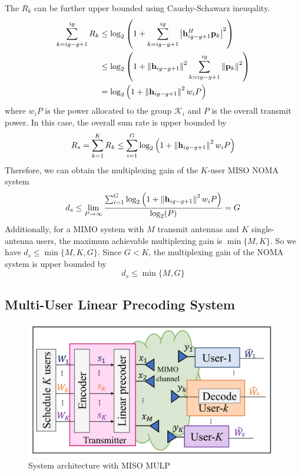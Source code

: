 \documentclass[10pt,conference]{IEEEtran}
\begin{document}
The $R_k$ can be further upper bounded using Cauchy-Schawarz ineuqality.
\begin{align}
    \sum_{k=ig-g+1}^{ig} R_k &\leq \log_2 \left( 1 + \sum_{k=ig-g+1}^{ig} \left| {\bf{h}}_{ig-g+1}^H {\bf{p}}_k \right|^2 \right) \nonumber \\
    & \leq \log_2 \left( 1 + \left\Vert{\bf{h}}_{ig-g+1}\right\Vert ^2 \sum_{k=ig-g+1}^{ig} \left\Vert {\bf{p}}_k \right\Vert^2 \right) \nonumber \\
    & = \log_2 \left( 1 + \left\Vert{\bf{h}}_{ig-g+1}\right\Vert ^2 w_i P \right)
\end{align}
where $w_i P$ is the power allocated to the group $\mathcal{K}_i$ and $P$ is the overall transmit power.
In this case, the overall sum rate is upper bounded by
\begin{equation}
    R_s = \sum_{k=1}^K R_k \leq \sum_{i=1}^G \log_2 \left( 1 + \left\Vert{\bf{h}}_{ig-g+1}\right\Vert ^2 w_i P \right) \label{46}
\end{equation}
Therefore, we can obtain the multiplexing gain of the $K$-user MISO NOMA system
\begin{equation}
    d_s \leq \lim_{P \to \infty} \frac{\sum_{i=1}^G \log_2 \left( 1 + \left\Vert{\bf{h}}_{ig-g+1}\right\Vert ^2 w_i P \right)}{\log_2 (P)} = G \label{eq47}
\end{equation} 
Additionally, for a MIMO system with $M$ transmit antennas and $K$ single-antenna users,
the maximum achievable multiplexing gain is $\min\{ M,K \}$. So we have $d_s \leq \min\{M,K,G\}$.
Since $G < K$, the multiplexing gain of the NOMA system is upper bounded by
\begin{equation}
    d_s \leq \min \{ M,G \} \label{eq47}
\end{equation}

\subsection{Multi-User Linear Precoding System}
\begin{figure} [htb]
    \centering
    \includegraphics[width=1\linewidth]{Fig9.png}
    \caption{System architecture with MISO MULP}
    \label{fig9}
\end{figure}
\end{document}
